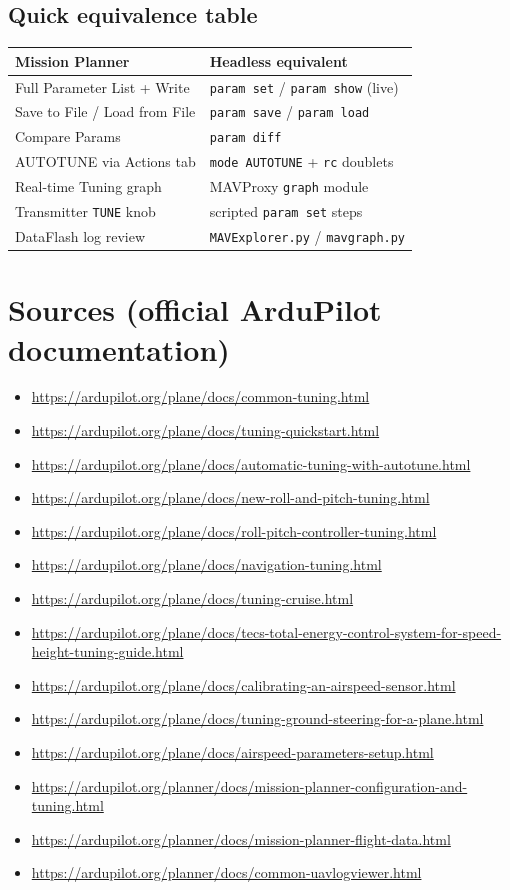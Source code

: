\documentclass[11pt,a4paper]{article}
\newcommand{\pp}[1]{\texttt{#1}} %
\begin{document}
\subsection{Quick equivalence table}
\begin{longtable}{@{}p{6.6cm}p{8.0cm}@{}}
\toprule
\textbf{Mission Planner} & \textbf{Headless equivalent}\\
\midrule
\endhead
Full Parameter List + Write & \pp{param set} / \pp{param show} (live)\\
Save to File / Load from File & \pp{param save} / \pp{param load}\\
Compare Params & \pp{param diff}\\
AUTOTUNE via Actions tab & \pp{mode AUTOTUNE} + \pp{rc} doublets\\
Real-time Tuning graph & MAVProxy \pp{graph} module\\
Transmitter \pp{TUNE} knob & scripted \pp{param set} steps\\
DataFlash log review & \pp{MAVExplorer.py} / \pp{mavgraph.py}\\
\bottomrule
\end{longtable}

\section{Sources (official ArduPilot documentation)}
\begin{itemize}[leftmargin=1.4em]
  \item \url{https://ardupilot.org/plane/docs/common-tuning.html}
  \item \url{https://ardupilot.org/plane/docs/tuning-quickstart.html}
  \item \url{https://ardupilot.org/plane/docs/automatic-tuning-with-autotune.html}
  \item \url{https://ardupilot.org/plane/docs/new-roll-and-pitch-tuning.html}
  \item \url{https://ardupilot.org/plane/docs/roll-pitch-controller-tuning.html}
  \item \url{https://ardupilot.org/plane/docs/navigation-tuning.html}
  \item \url{https://ardupilot.org/plane/docs/tuning-cruise.html}
  \item \url{https://ardupilot.org/plane/docs/tecs-total-energy-control-system-for-speed-height-tuning-guide.html}
  \item \url{https://ardupilot.org/plane/docs/calibrating-an-airspeed-sensor.html}
  \item \url{https://ardupilot.org/plane/docs/tuning-ground-steering-for-a-plane.html}
  \item \url{https://ardupilot.org/plane/docs/airspeed-parameters-setup.html}
  \item \url{https://ardupilot.org/planner/docs/mission-planner-configuration-and-tuning.html}
  \item \url{https://ardupilot.org/planner/docs/mission-planner-flight-data.html}
  \item \url{https://ardupilot.org/planner/docs/common-uavlogviewer.html}
\end{itemize}
\end{document}
